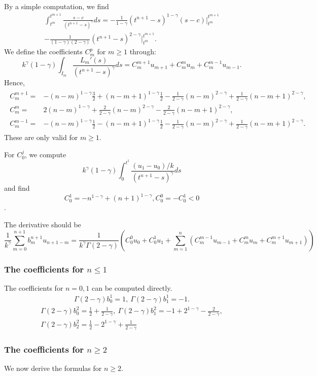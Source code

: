 \documentclass[11pt]{article}
\begin{document}
By a simple computation, we find 
\begin{multline*}
\int_{t^m}^{t^{m+1}}\frac{s-c}{(t^{n+1}-s)^{\gamma}}ds
=-\frac{1}{1-\gamma}(t^{n+1}-s)^{1-\gamma}(s-c)|_{t^m}^{t^{m+1}}\\
-\frac{1}{(1-\gamma)(2-\gamma)}(t^{n+1}-s)^{2-\gamma}|_{t^m}^{t^{m+1}}.
\end{multline*}
We define the coefficients $C_m^p$ for $m\ge 1$ through: $$
k^{\gamma}(1-\gamma)\int_{I_m}\frac{L_m'(s)}{(t^{n+1}-s)^{\gamma}}ds=C_m^{m+1}u_{m+1}+C_m^mu_m+C_{m}^{m-1}u_{m-1}.
$$
Hence,
\begin{gather*}
\begin{array}{cl}
C_m^{m+1}=&-(n-m)^{1-\gamma}\frac{3}{2}+(n-m+1)^{1-\gamma}\frac{1}{2}
-\frac{1}{2-\gamma}(n-m)^{2-\gamma}+\frac{1}{2-\gamma}(n-m+1)^{2-\gamma},\\
C_m^m=&2(n-m)^{1-\gamma}+\frac{2}{2-\gamma}(n-m)^{2-\gamma}
-\frac{2}{2-\gamma}(n-m+1)^{2-\gamma},\\
C_m^{m-1}=&-(n-m)^{1-\gamma}\frac{1}{2}-(n-m+1)^{1-\gamma}\frac{1}{2}
-\frac{1}{2-\gamma}(n-m)^{2-\gamma}+\frac{1}{2-\gamma}(n-m+1)^{2-\gamma}.
\end{array}
\end{gather*}
These are only valid for $m\ge 1$.

For $C_0^j$, we compute $$
k^{\gamma}(1-\gamma)\int_0^{t^1}\frac{(u_1-u_0)/k}{(t^{n+1}-s)^{\gamma}}ds
$$
and find $$C_0^1=-n^{1-\gamma}+(n+1)^{1-\gamma}, C_0^0=-C_0^1<0$$.

The derivative should be $$
\frac{1}{k^{\gamma}}\sum_{m=0}^{n+1}b_{m}^{n+1}u_{n+1-m}=\frac{1}{k^{\gamma}\Gamma(2-\gamma)}(C_0^0u_0+C_0^1u_1+\sum_{m=1}^n(C_m^{m-1}u_{m-1}
+C_m^{m}u_m+C_m^{m+1}u_{m+1}))
$$

\subsubsection{The coefficients for $n\le 1$}
The coefficients for $n=0, 1$ can be computed directly.
\begin{gather}
\Gamma(2-\gamma)b_0^1=1,\ \Gamma(2-\gamma)b_1^1=-1.
\end{gather}
\begin{multline}
\Gamma(2-\gamma)b_0^2=\frac{1}{2}+\frac{1}{2-\gamma},\
\Gamma(2-\gamma)b_1^2=-1+2^{1-\gamma}-\frac{2}{2-\gamma},\\
\Gamma(2-\gamma)b_2^2=\frac{1}{2}-2^{1-\gamma}+\frac{1}{2-\gamma}
\end{multline}


\subsubsection{The coefficients for $n\ge 2$}
We now derive the formulas for $n\ge 2$.
\end{document}
